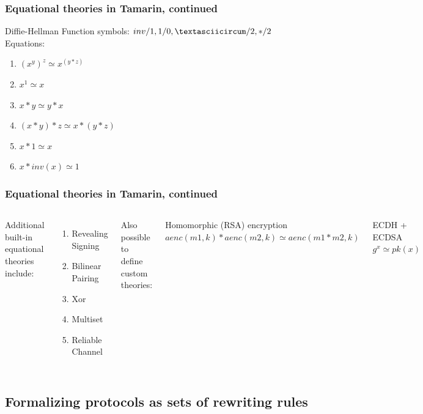 \documentclass[aspectratio=169,t,xcolor=table]{beamer}
\begin{document}
\begin{frame}
    \frametitle{Equational theories in Tamarin, continued}
    \begin{block}{Diffie-Hellman}
        Function symbols: $inv/1, 1/0, \textasciicircum/2, */2$\\
        Equations:
        \begin{enumerate}
            \item $(x^y)^z  \simeq x^{(y*z)}$
            \item $x^1      \simeq x$
            \item $x*y      \simeq y*x$
            \item $(x*y)*z  \simeq x*(y*z)$
            \item $x*1      \simeq x$
            \item $x*inv(x) \simeq 1$
        \end{enumerate}
    \end{block}
\end{frame}

\begin{frame}
    \frametitle{Equational theories in Tamarin, continued}
    \begin{columns}
            Additional built-in equational theories include:
            \begin{enumerate}
                \item Revealing Signing
                \item Bilinear Pairing
                \item Xor
                \item Multiset
                \item Reliable Channel
            \end{enumerate}
            Also possible to define custom theories:
            \begin{block}{Homomorphic (RSA) encryption}
                $aenc(m1, k) * aenc(m2, k) \simeq aenc(m1*m2, k)$
            \end{block}
            \begin{block}{ECDH + ECDSA}
                $g^x \simeq pk(x)$
            \end{block}
    \end{columns}
\end{frame}

\subsection{Formalizing protocols as sets of rewriting rules}
\end{document}
